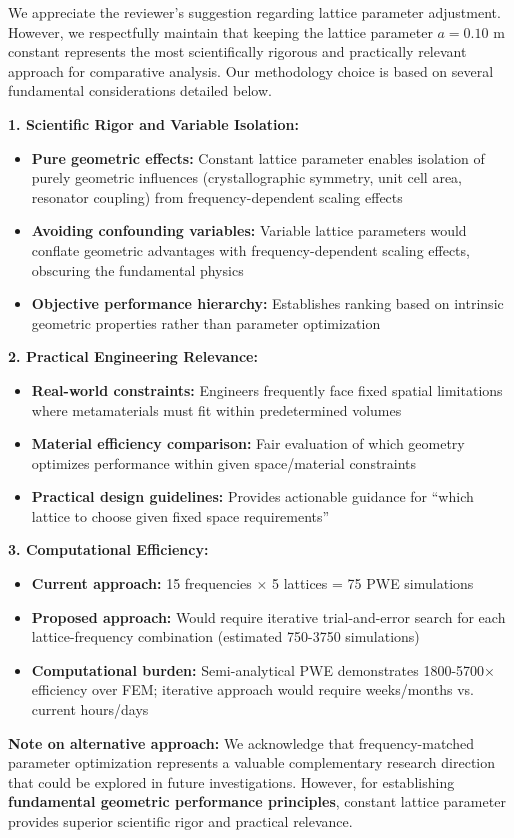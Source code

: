 \documentclass[11pt,a4paper]{article}
\newenvironment{responsebox}{%
    \par\medskip\noindent{\color{responsecolor}\rule{\linewidth}{2pt}}\par
    \noindent{\color{responsecolor}\bfseries Response}\par\smallskip
}{%
    \par\noindent{\color{responsecolor}\rule{\linewidth}{0.5pt}}\medskip
}
\begin{document}
\begin{responsebox}
We appreciate the reviewer's suggestion regarding lattice parameter adjustment. However, we respectfully maintain that keeping the lattice parameter $a = 0.10$ m constant represents the most scientifically rigorous and practically relevant approach for comparative analysis. Our methodology choice is based on several fundamental considerations detailed below.

\textbf{1. Scientific Rigor and Variable Isolation:}
\begin{itemize}
    \item \textbf{Pure geometric effects:} Constant lattice parameter enables isolation of purely geometric influences (crystallographic symmetry, unit cell area, resonator coupling) from frequency-dependent scaling effects
    \item \textbf{Avoiding confounding variables:} Variable lattice parameters would conflate geometric advantages with frequency-dependent scaling effects, obscuring the fundamental physics
    \item \textbf{Objective performance hierarchy:} Establishes ranking based on intrinsic geometric properties rather than parameter optimization
\end{itemize}

\textbf{2. Practical Engineering Relevance:}
\begin{itemize}
    \item \textbf{Real-world constraints:} Engineers frequently face fixed spatial limitations where metamaterials must fit within predetermined volumes
    \item \textbf{Material efficiency comparison:} Fair evaluation of which geometry optimizes performance within given space/material constraints
    \item \textbf{Practical design guidelines:} Provides actionable guidance for ``which lattice to choose given fixed space requirements''
\end{itemize}

\textbf{3. Computational Efficiency:}
\begin{itemize}
    \item \textbf{Current approach:} 15 frequencies $\times$ 5 lattices = 75 PWE simulations
    \item \textbf{Proposed approach:} Would require iterative trial-and-error search for each lattice-frequency combination (estimated 750-3750 simulations)
    \item \textbf{Computational burden:} Semi-analytical PWE demonstrates 1800-5700$\times$ efficiency over FEM; iterative approach would require weeks/months vs. current hours/days
\end{itemize}

\textbf{Note on alternative approach:} We acknowledge that frequency-matched parameter optimization represents a valuable complementary research direction that could be explored in future investigations. However, for establishing \textbf{fundamental geometric performance principles}, constant lattice parameter provides superior scientific rigor and practical relevance.
\end{responsebox}
\end{document}
